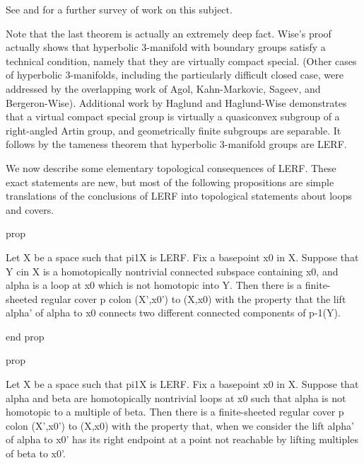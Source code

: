 See \cite{LR} and \cite{AFW} for a further survey of work on this subject.

Note that the last theorem is actually an extremely deep fact. Wise's proof
actually shows that hyperbolic 3-manifold with boundary groups satisfy
a technical condition, namely that they are virtually compact special. (Other
cases of hyperbolic 3-manifolds, including the particularly difficult closed
case, were addressed by the overlapping work of Agol, Kahn-Markovic, Sageev,
and Bergeron-Wise).  Additional work by Haglund and Haglund-Wise demonstrates
that a virtual compact special group is virtually a quasiconvex subgroup of
a right-angled Artin group, and geometrically finite subgroups are separable.
It follows by the tameness theorem that hyperbolic 3-manifold groups are LERF.

%
%


We now describe some elementary topological consequences of LERF. These exact
statements are new, but most of the following propositions are simple
translations of the conclusions of LERF into topological statements about loops
and covers.

prop

Let X be a space such that pi1X is LERF. Fix a basepoint x0 in X. Suppose that
Y cin X is a homotopically nontrivial connected subspace containing x0, and
alpha is a loop at x0 which is not homotopic into Y. Then there is
a finite-sheeted regular cover p colon (X',x0') to (X,x0) with the property
that the lift alpha' of alpha to x0 connects two different connected components
of p-1(Y).

end prop

prop

Let X be a space such that pi1X is LERF. Fix a basepoint x0 in X. Suppose that
alpha and beta are homotopically nontrivial loops at x0 such that alpha is not
homotopic to a multiple of beta. Then there is a finite-sheeted regular cover
p colon (X',x0') to (X,x0) with the property that, when we consider the lift
alpha' of alpha to x0' has its right endpoint at a point not reachable by
lifting multiples of beta to x0'.

